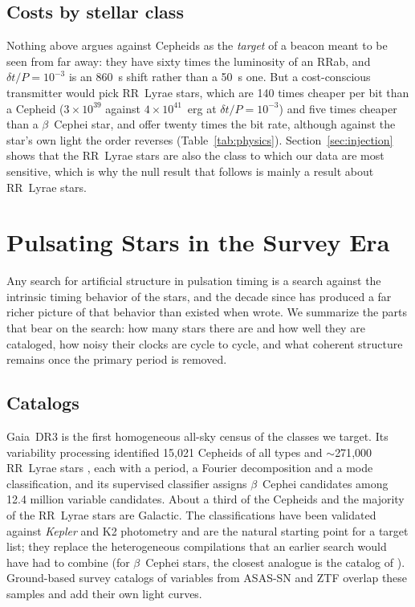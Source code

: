 \documentclass[final,5p]{elsarticle}
\newcommand{\dtp}{\ensuremath{\delta t/P}}
\newcommand{\bcep}{\ensuremath{\beta}~Cephei}
\begin{document}
\subsection{Costs by stellar class}
\label{sec:whichstars}

Nothing above argues against Cepheids as the \emph{target} of a beacon meant to be seen from far away: they have sixty times the luminosity of an RRab, and $\dtp=10^{-3}$ is an 860~s shift rather than a 50~s one. But a cost-conscious transmitter would pick RR~Lyrae stars, which are 140 times cheaper per bit than a Cepheid ($3\times10^{39}$ against $4\times10^{41}$~erg at $\dtp=10^{-3}$) and five times cheaper than a \bcep{} star, and offer twenty times the bit rate, although against the star's own light the order reverses (Table~\ref{tab:physics}). Section~\ref{sec:injection} shows that the RR~Lyrae stars are also the class to which our data are most sensitive, which is why the null result that follows is mainly a result about RR~Lyrae stars.

\section{Pulsating Stars in the Survey Era}
\label{sec:surveys}

Any search for artificial structure in pulsation timing is a search against the intrinsic timing behavior of the stars, and the decade since \citet{Hippke2015} has produced a far richer picture of that behavior than existed when \citet{Learned2008} wrote. We summarize the parts that bear on the search: how many stars there are and how well they are cataloged, how noisy their clocks are cycle to cycle, and what coherent structure remains once the primary period is removed.

\subsection{Catalogs}
\label{sec:catalogs}

Gaia~DR3 \citep{GaiaDR3} is the first homogeneous all-sky census of the classes we target. Its variability processing \citep{Eyer2023} identified 15{,}021 Cepheids of all types \citep{Ripepi2023} and $\sim$271{,}000 RR~Lyrae stars \citep{Clementini2023}, each with a period, a Fourier decomposition and a mode classification, and its supervised classifier \citep{Rimoldini2023} assigns \bcep{} candidates among 12.4 million variable candidates. About a third of the Cepheids and the majority of the RR~Lyrae stars are Galactic. The classifications have been validated against \emph{Kepler} and K2 photometry \citep{Molnar2018gaia} and are the natural starting point for a target list; they replace the heterogeneous compilations that an earlier search would have had to combine (for \bcep{} stars, the closest analogue is the catalog of \citealt{Stankov2005}). Ground-based survey catalogs of variables from ASAS-SN \citep{Jayasinghe2018, Jayasinghe2019, Christy2023} and ZTF \citep{Chen2020} overlap these samples and add their own light curves.
\end{document}
